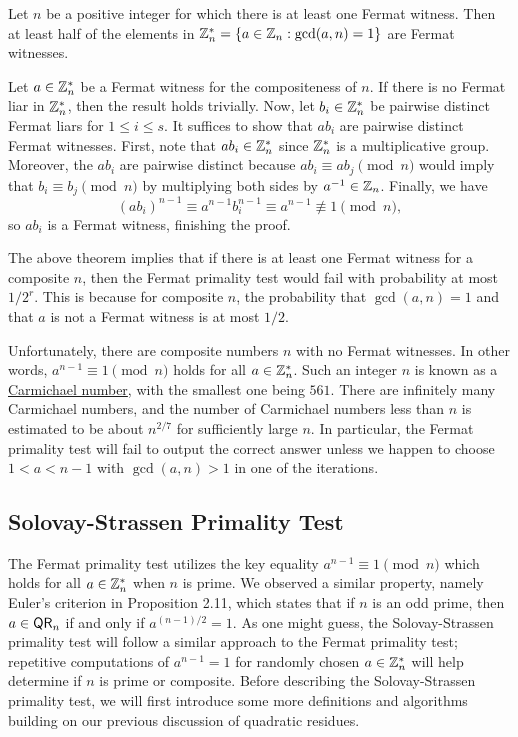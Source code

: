 \begin{thm}
Let $n$ be a positive integer for which there is at least one Fermat witness. Then at least 
half of the elements in $\mathbb{Z}_n^* = \{a \in \mathbb{Z}_n : \gcd(a, n) = 1\}$ are Fermat witnesses. 
\end{thm}
\begin{pf}
Let $a \in \mathbb{Z}_n^*$ be a Fermat witness for the compositeness of $n$. If there is no Fermat liar in 
$\mathbb{Z}_n^*$, then the result holds trivially. Now, let $b_i \in \mathbb{Z}_n^*$ be pairwise distinct 
Fermat liars for $1 \leq i \leq s$. It suffices to show that $ab_i$ are pairwise distinct 
Fermat witnesses. First, note that $ab_i \in \mathbb{Z}_n^*$ since $\mathbb{Z}_n^*$ is a multiplicative group. 
Moreover, the $ab_i$ are pairwise distinct because $ab_i \equiv ab_j \pmod n$ would imply that 
$b_i \equiv b_j \pmod n$ by multiplying both sides by $a^{-1} \in \mathbb{Z}_n$. Finally, we have 
\[ (ab_i)^{n-1} \equiv a^{n-1} b_i^{n-1} \equiv a^{n-1} \not\equiv 1 \pmod n, \]
so $ab_i$ is a Fermat witness, finishing the proof. 
\end{pf}

The above theorem implies that if there is at least one Fermat witness for a composite $n$, then 
the Fermat primality test would fail with probability at most $1/2^r$. This is because for 
composite $n$, the probability that $\gcd(a, n) = 1$ and that $a$ is not a Fermat witness is at 
most $1/2$. 

Unfortunately, there are composite numbers $n$ with no Fermat witnesses. 
In other words, $a^{n-1} \equiv 1 \pmod n$ holds for all $a \in \mathbb{Z}_n^*$. Such an integer $n$ 
is known as a \href{https://en.wikipedia.org/wiki/Carmichael_number}{Carmichael number}, with the smallest one being $561$. There are 
infinitely many Carmichael numbers, and the number of Carmichael numbers less than $n$ is 
estimated to be about $n^{2/7}$ for sufficiently large $n$. In particular, the Fermat primality 
test will fail to output the correct answer unless we happen to choose $1 < a < n-1$ with 
$\gcd(a, n) > 1$ in one of the iterations. 

\subsection{Solovay-Strassen Primality Test}
The Fermat primality test utilizes the key equality $a^{n-1} \equiv 1 \pmod n$ which holds for all $a \in 
\mathbb{Z}_n^*$ when $n$ is prime. We observed a similar property, namely Euler's criterion in Proposition 2.11,
which states that if $n$ is an odd prime, then $a \in {\sf QR}_n$ if and only if $a^{(n-1)/2} = 1$. 
As one might guess, the Solovay-Strassen primality test will follow a similar approach to the 
Fermat primality test; repetitive computations of $a^{n-1} = 1$ for randomly chosen 
$a \in \mathbb{Z}_n^*$ will help determine if $n$ is prime or composite. Before describing the 
Solovay-Strassen primality test, we will first introduce some more definitions and algorithms 
building on our previous discussion of quadratic residues. 

